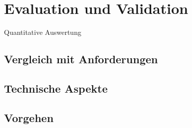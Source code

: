 \chapter{Evaluation und Validation}
\label{ch:Eval}


Quantitative Auswertung

\section{Vergleich mit Anforderungen}
\label{sec:VergleichAnforderungen}

\section{Technische Aspekte}

\section{Vorgehen}
